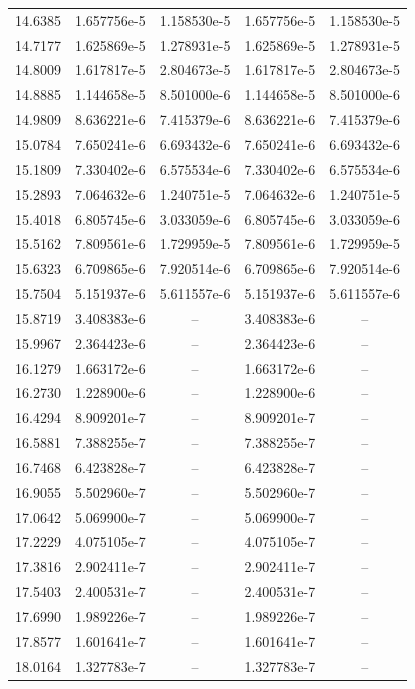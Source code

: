 \documentclass[fleqn,usenatbib]{mnras}
\begin{document}
\begin{table}
\begin{tabular}{c|cccc}
14.6385 & 1.657756e-5 & 1.158530e-5 & 1.657756e-5 & 1.158530e-5\\
14.7177 & 1.625869e-5 & 1.278931e-5 & 1.625869e-5 & 1.278931e-5\\
14.8009 & 1.617817e-5 & 2.804673e-5 & 1.617817e-5 & 2.804673e-5\\
14.8885 & 1.144658e-5 & 8.501000e-6 & 1.144658e-5 & 8.501000e-6\\
14.9809 & 8.636221e-6 & 7.415379e-6 & 8.636221e-6 & 7.415379e-6\\
15.0784 & 7.650241e-6 & 6.693432e-6 & 7.650241e-6 & 6.693432e-6\\
15.1809 & 7.330402e-6 & 6.575534e-6 & 7.330402e-6 & 6.575534e-6\\
15.2893 & 7.064632e-6 & 1.240751e-5 & 7.064632e-6 & 1.240751e-5\\
15.4018 & 6.805745e-6 & 3.033059e-6 & 6.805745e-6 & 3.033059e-6\\\hline
15.5162 & 7.809561e-6 & 1.729959e-5 & 7.809561e-6 & 1.729959e-5\\
15.6323 & 6.709865e-6 & 7.920514e-6 & 6.709865e-6 & 7.920514e-6\\
15.7504 & 5.151937e-6 & 5.611557e-6 & 5.151937e-6 & 5.611557e-6\\
15.8719 & 3.408383e-6 & -- & 3.408383e-6 & --\\
15.9967 & 2.364423e-6 & -- & 2.364423e-6 & --\\
16.1279 & 1.663172e-6 & -- & 1.663172e-6 & --\\
16.2730 & 1.228900e-6 & -- & 1.228900e-6 & --\\
16.4294 & 8.909201e-7 & -- & 8.909201e-7 & --\\
16.5881 & 7.388255e-7 & -- & 7.388255e-7 & --\\
16.7468 & 6.423828e-7 & -- & 6.423828e-7 & --\\\hline
16.9055 & 5.502960e-7 & -- & 5.502960e-7 & --\\
17.0642 & 5.069900e-7 & -- & 5.069900e-7 & --\\
17.2229 & 4.075105e-7 & -- & 4.075105e-7 & --\\
17.3816 & 2.902411e-7 & -- & 2.902411e-7 & --\\
17.5403 & 2.400531e-7 & -- & 2.400531e-7 & --\\
17.6990 & 1.989226e-7 & -- & 1.989226e-7 & --\\
17.8577 & 1.601641e-7 & -- & 1.601641e-7 & --\\
18.0164 & 1.327783e-7 & -- & 1.327783e-7 & --\\

\end{tabular}
\end{table}
\end{document}
